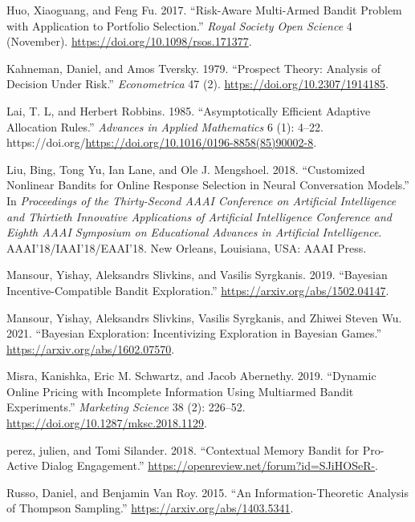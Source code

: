 \documentclass[
  letterpaper,
  numbers=noenddot,
  DIV=11]{scrreprt}
\newlength{\cslhangindent}
\newenvironment{CSLReferences}[2] %
 {\begin{list}{}{%
  \setlength{\itemindent}{0pt}
  \setlength{\leftmargin}{0pt}
  \setlength{\parsep}{0pt}
  \ifodd #1
   \setlength{\leftmargin}{\cslhangindent}
   \setlength{\itemindent}{-1\cslhangindent}
  \fi
  \setlength{\itemsep}{#2\baselineskip}}}
 {\end{list}}
\theoremstyle{definition}
\theoremstyle{plain}
\theoremstyle{plain}
\theoremstyle{remark}
\begin{document}
\begin{CSLReferences}{1}{0}
Huo, Xiaoguang, and Feng Fu. 2017. {``Risk-Aware Multi-Armed Bandit
Problem with Application to Portfolio Selection.''} \emph{Royal Society
Open Science} 4 (November). \url{https://doi.org/10.1098/rsos.171377}.

Kahneman, Daniel, and Amos Tversky. 1979. {``Prospect Theory: Analysis
of Decision Under Risk.''} \emph{Econometrica} 47 (2).
\url{https://doi.org/10.2307/1914185}.

Lai, T. L, and Herbert Robbins. 1985. {``Asymptotically Efficient
Adaptive Allocation Rules.''} \emph{Advances in Applied Mathematics} 6
(1): 4--22.
https://doi.org/\url{https://doi.org/10.1016/0196-8858(85)90002-8}.

Liu, Bing, Tong Yu, Ian Lane, and Ole J. Mengshoel. 2018. {``Customized
Nonlinear Bandits for Online Response Selection in Neural Conversation
Models.''} In \emph{Proceedings of the Thirty-Second AAAI Conference on
Artificial Intelligence and Thirtieth Innovative Applications of
Artificial Intelligence Conference and Eighth AAAI Symposium on
Educational Advances in Artificial Intelligence}.
AAAI'18/IAAI'18/EAAI'18. New Orleans, Louisiana, USA: AAAI Press.

Mansour, Yishay, Aleksandrs Slivkins, and Vasilis Syrgkanis. 2019.
{``Bayesian Incentive-Compatible Bandit Exploration.''}
\url{https://arxiv.org/abs/1502.04147}.

Mansour, Yishay, Aleksandrs Slivkins, Vasilis Syrgkanis, and Zhiwei
Steven Wu. 2021. {``Bayesian Exploration: Incentivizing Exploration in
Bayesian Games.''} \url{https://arxiv.org/abs/1602.07570}.

Misra, Kanishka, Eric M. Schwartz, and Jacob Abernethy. 2019. {``Dynamic
Online Pricing with Incomplete Information Using Multiarmed Bandit
Experiments.''} \emph{Marketing Science} 38 (2): 226--52.
\url{https://doi.org/10.1287/mksc.2018.1129}.

perez, julien, and Tomi Silander. 2018. {``Contextual Memory Bandit for
Pro-Active Dialog Engagement.''}
\url{https://openreview.net/forum?id=SJiHOSeR-}.

Russo, Daniel, and Benjamin Van Roy. 2015. {``An Information-Theoretic
Analysis of Thompson Sampling.''} \url{https://arxiv.org/abs/1403.5341}.


\end{CSLReferences}
\end{document}
